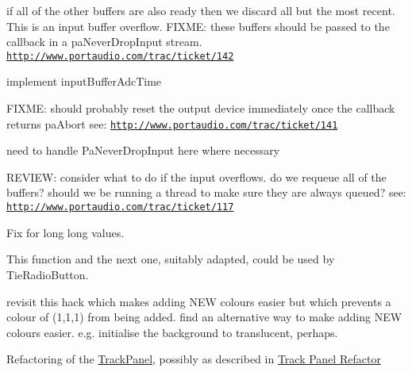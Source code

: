 \begin{DoxyRefList}
if all of the other buffers are also ready then we discard all but the most recent. This is an input buffer overflow. F\+I\+X\+ME\+: these buffers should be passed to the callback in a pa\+Never\+Drop\+Input stream. \href{http://www.portaudio.com/trac/ticket/142}{\tt http\+://www.\+portaudio.\+com/trac/ticket/142}

implement input\+Buffer\+Adc\+Time 

F\+I\+X\+ME\+: should probably reset the output device immediately once the callback returns pa\+Abort see\+: \href{http://www.portaudio.com/trac/ticket/141}{\tt http\+://www.\+portaudio.\+com/trac/ticket/141} 

need to handle Pa\+Never\+Drop\+Input here where necessary  
\item[\label{todo__todo000040}%
\hypertarget{todo__todo000040}{}%
Member \hyperlink{pa__mac__core__internal_8h_a3aa8874a48f232c61d4101706df2b269}{Read\+Stream} (Pa\+Stream $\ast$stream, void $\ast$buffer, unsigned long frames)]R\+E\+V\+I\+EW\+: consider what to do if the input overflows. do we requeue all of the buffers? should we be running a thread to make sure they are always queued? see\+: \href{http://www.portaudio.com/trac/ticket/117}{\tt http\+://www.\+portaudio.\+com/trac/ticket/117}  
\item[\label{todo__todo000048}%
\hypertarget{todo__todo000048}{}%
Member \hyperlink{class_shuttle_ab9d16128c80cdb3c494b0830127a6936}{Shuttle\+:\+:Transfer\+Long\+Long} (const wx\+String \&Name, wx\+Long\+Long\+\_\+t \&i\+Value, const wx\+Long\+Long\+\_\+t \&i\+Default)]Fix for long long values.  
\item[\label{todo__todo000049}%
\hypertarget{todo__todo000049}{}%
Member \hyperlink{class_shuttle_gui_base_a7f7670bb731cda2f9c1da83640ba2e2d}{Shuttle\+Gui\+Base\+:\+:Add\+Radio\+Button} (const wx\+String \&Prompt)]This function and the next one, suitably adapted, could be used by Tie\+Radio\+Button.  
\item[\label{todo__todo000050}%
\hypertarget{todo__todo000050}{}%
Member \hyperlink{class_theme_base_abb088440b44d8fa1274094c8e8e9096c}{Theme\+Base\+:\+:Read\+Image\+Cache} (bool b\+Binary\+Read=true, bool b\+Ok\+If\+Not\+Found=false)]revisit this hack which makes adding N\+EW colours easier but which prevents a colour of (1,1,1) from being added. find an alternative way to make adding N\+EW colours easier. e.\+g. initialise the background to translucent, perhaps.  
\item[\label{todo__todo000052}%
\hypertarget{todo__todo000052}{}%
File \hyperlink{_track_panel_8cpp}{Track\+Panel.cpp} ]Refactoring of the \hyperlink{class_track_panel}{Track\+Panel}, possibly as described in \hyperlink{TrackPanelRefactor}{Track Panel Refactor} 

\end{DoxyRefList}
